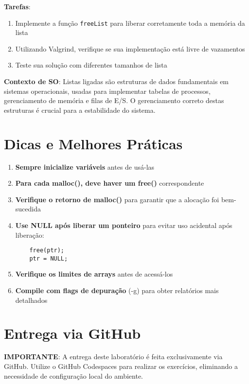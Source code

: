 \documentclass[11pt,a4paper]{article}
\begin{document}
\textbf{Tarefas}:
\begin{enumerate}
    \item Implemente a função \texttt{freeList} para liberar corretamente toda a memória da lista
    \item Utilizando Valgrind, verifique se sua implementação está livre de vazamentos
    \item Teste sua solução com diferentes tamanhos de lista
\end{enumerate}

\textbf{Contexto de SO}: Listas ligadas são estruturas de dados fundamentais em sistemas operacionais, usadas para implementar tabelas de processos, gerenciamento de memória e filas de E/S. O gerenciamento correto destas estruturas é crucial para a estabilidade do sistema.

\section{Dicas e Melhores Práticas}

\begin{enumerate}
    \item \textbf{Sempre inicialize variáveis} antes de usá-las
    \item \textbf{Para cada malloc(), deve haver um free()} correspondente
    \item \textbf{Verifique o retorno de malloc()} para garantir que a alocação foi bem-sucedida
    \item \textbf{Use NULL após liberar um ponteiro} para evitar uso acidental após liberação:
    \begin{lstlisting}
    free(ptr);
    ptr = NULL;
    \end{lstlisting}
    \item \textbf{Verifique os limites de arrays} antes de acessá-los
    \item \textbf{Compile com flags de depuração} (-g) para obter relatórios mais detalhados
\end{enumerate}

\section{Entrega via GitHub}

\textbf{IMPORTANTE}: A entrega deste laboratório é feita exclusivamente via GitHub. Utilize o GitHub Codespaces para realizar os exercícios, eliminando a necessidade de configuração local do ambiente.
\end{document}

